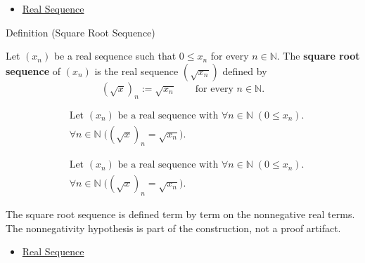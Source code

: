 \begin{dependencies}
\begin{itemize}
  \item \hyperref[def:real-sequence]{Real Sequence}
\end{itemize}
\end{dependencies}


\begin{definitionbox}{Definition (Square Root Sequence)}
\begin{definition}
\label{def:square-root-sequence}
Let $(x_n)$ be a real sequence such that $0\le x_n$ for every
$n\in\mathbb{N}$. The \textbf{square root sequence} of $(x_n)$ is the real
sequence $(\sqrt{x_n})$ defined by
\[
(\sqrt{x})_n := \sqrt{x_n}
\qquad
\text{for every } n\in\mathbb{N}.
\]
\end{definition}
\end{definitionbox}

\begin{remark*}
\[
\begin{aligned}
&\text{Let } (x_n) \text{ be a real sequence with }
  \forall n\in\mathbb{N}\;(0\le x_n).\\
&\forall n\in\mathbb{N}\;\bigl((\sqrt{x})_n=\sqrt{x_n}\bigr).
\end{aligned}
\]
\end{remark*}

\begin{remark*}
\[
\begin{aligned}
&\text{Let } (x_n) \text{ be a real sequence with }
  \forall n\in\mathbb{N}\;(0\le x_n).\\
&\forall n\in\mathbb{N}\;\bigl((\sqrt{x})_n=\sqrt{x_n}\bigr).
\end{aligned}
\]
\end{remark*}

\begin{remark*}[Interpretation]
The square root sequence is defined term by term on the nonnegative real
terms. The nonnegativity hypothesis is part of the construction, not a proof
artifact.
\end{remark*}

\begin{dependencies}
\begin{itemize}
  \item \hyperref[def:real-sequence]{Real Sequence}
\end{itemize}
\end{dependencies}

